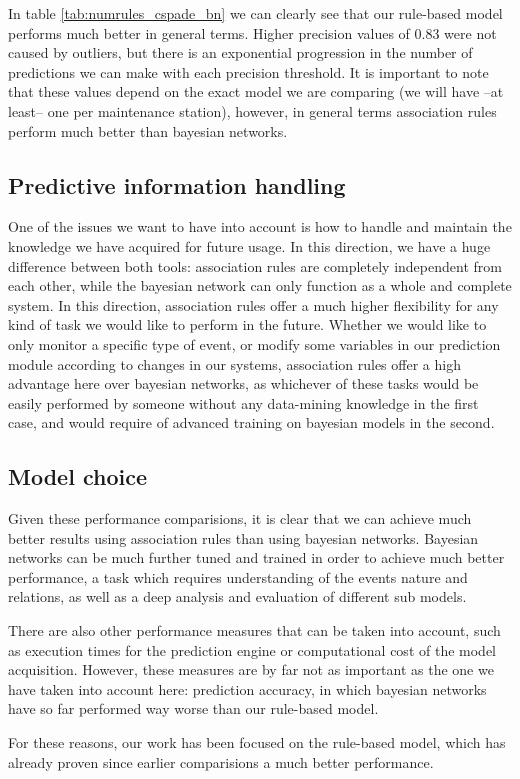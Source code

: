 \documentclass[a4paper,12pt]{article}
\begin{document}
In table \ref{tab:numrules_cspade_bn} we can clearly see that our rule-based model performs much better in general terms. Higher precision values of 0.83 were not caused by outliers, but there is an exponential progression in the number of predictions we can make with each precision threshold. It is important to note that these values depend on the exact model we are comparing (we will have --at least-- one per maintenance station), however, in general terms association rules perform much better than bayesian networks.

\subsection{Predictive information handling}
One of the issues we want to have into account is how to handle and maintain the knowledge we have acquired for future usage. In this direction, we have a huge difference between both tools: association rules are completely independent from each other, while the bayesian network can only function as a whole and complete system. In this direction, association rules offer a much higher flexibility for any kind of task we would like to perform in the future. Whether we would like to only monitor a specific type of event, or modify some variables in our prediction module according to changes in our systems, association rules offer a high advantage here over bayesian networks, as whichever of these tasks would be easily performed by someone without any data-mining knowledge in the first case, and would require of advanced training on bayesian models in the second.

\subsection{Model choice}
Given these performance comparisions, it is clear that we can achieve much better results using association rules than using bayesian networks. Bayesian networks can be much further tuned and trained in order to achieve much better performance, a task which requires understanding of the events nature and relations, as well as a deep analysis and evaluation of different sub models.

There are also other performance measures that can be taken into account, such as execution times for the prediction engine or computational cost of the model acquisition. However, these measures are by far not as important as the one we have taken into account here: prediction accuracy, in which bayesian networks have so far performed way worse than our rule-based model. 

For these reasons, our work has been focused on the rule-based model, which has already proven since earlier comparisions a much better performance.


\clearpage

 

\end{document}
